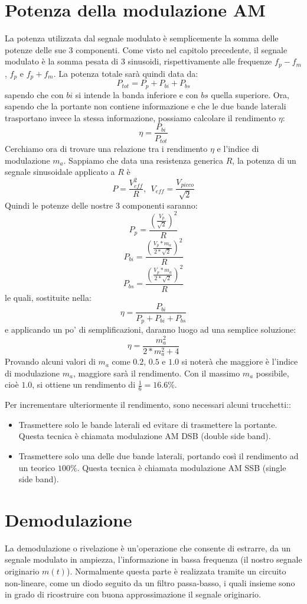 \documentclass[11pt,a4paper]{article}
\begin{document}
\section{Potenza della modulazione AM}
La potenza utilizzata dal segnale modulato è semplicemente la somma delle potenze delle sue 3 componenti. Come visto nel capitolo precedente, il segnale modulato è la somma pesata di 3 sinusoidi, rispettivamente alle frequenze $f_p - f_m$, $f_p$ e $f_p + f_m$. La potenza totale sarà quindi data da:
$$
P_{tot} = P_p + P_{bi} + P_{bs} 
$$
sapendo che con $bi$ si intende la banda inferiore e con $bs$ quella superiore. Ora, sapendo che la portante non contiene informazione e che le due bande laterali trasportano invece la stessa informazione, possiamo calcolare il rendimento $\eta$:
$$
\eta = \frac {P_{bi}}{P_{tot}}
$$
Cerchiamo ora di trovare una relazione tra i rendimento $\eta$ e l'indice di modulazione $m_a$. Sappiamo che data una resistenza generica $R$, la potenza di un segnale sinusoidale applicato a $R$ è 
$$
P = \frac{V_{eff}^2}{R}, \ \ V_{eff} = \frac{V_{picco}}{\sqrt{2}}
$$
Quindi le potenze delle nostre 3 componenti saranno:
$$
P_p = \frac{(\frac{V_p}{\sqrt{2}})^2}{R}
$$
$$
P_{bi} = \frac{(\frac{V_p * m_a}{2 * \sqrt{2}})^2}{R}
$$
$$
P_{bs} = \frac{(\frac{V_p * m_a}{2 * \sqrt{2}})^2}{R}
$$
le quali, sostituite nella:
$$
\eta = \frac{P_{bi}}{P_p + P_{bi} + P_{bs}}
$$
e applicando un po' di semplificazioni, daranno luogo ad una semplice soluzione:
$$
\eta = \frac{m_a^2}{2*m_a^2 + 4}
$$
Provando alcuni valori di $m_a$ come $0.2$, $0.5$ e $1.0$ si noterà che maggiore è l'indice di modulazione $m_a$, maggiore sarà il rendimento. Con il massimo $m_a$ possibile, cioè $1.0$, si ottiene un rendimento di $\frac{1}{6} = 16.6\%$.

Per incrementare ulteriormente il rendimento, sono necessari alcuni trucchetti::
\begin{itemize}
\item Trasmettere solo le bande laterali ed evitare di trasmettere la portante. Questa tecnica è chiamata modulazione AM DSB (double side band).
\item Trasmettere solo una delle due bande laterali, portando così il rendimento ad un teorico $100\%$. Questa tecnica è chiamata modulazione AM SSB (single side band).
\end{itemize}

\section{Demodulazione}
La demodulazione o rivelazione è un'operazione che consente di estrarre, da un segnale modulato in ampiezza, l'informazione in bassa frequenza (il nostro segnale originario $m(t)$).
Normalmente questa parte è realizzata tramite un circuito non-lineare, come un diodo seguito da un filtro passa-basso, i quali insieme sono in grado di ricostruire con buona approssimazione il segnale originario. \
\end{document}
